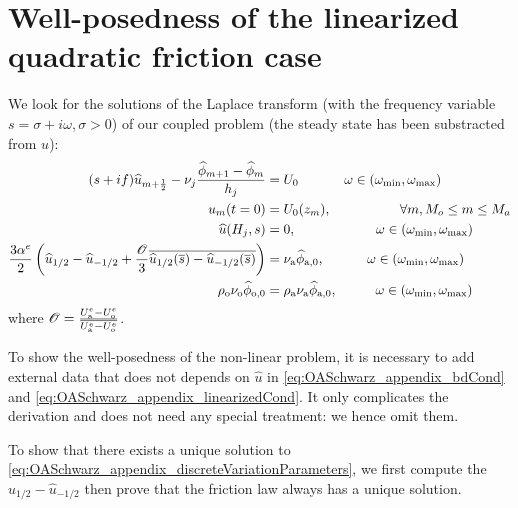 \section{Well-posedness of the linearized quadratic friction case}
\label{sec:OASchwarz_appendix_discreteVariationParameters}
We look for the solutions of the Laplace transform
(with the frequency variable $s=\sigma + i\omega, \sigma>0$) of our
coupled problem (the steady state has been substracted from $u$):
\begin{subequations}
	\label{eq:OASchwarz_appendix_discreteVariationParameters}
	\begin{align}
	(s + if) \widehat{u}_{m+\frac{1}{2}} -
		\nu_j \frac{\widehat{\phi}_{m+1} -
		\widehat{\phi}_m}{h_j}
		&=U_0
	\hspace{1.2cm} \omega \in
	(\omega_{\min},\omega_{\max})
		\label{eq:OASchwarz_appendix_eqFourier}\\
		u_m(t=0) &= U_0(z_m),   \hspace{1.8cm}
		\forall m, M_o \leq m \leq M_a \\
		\widehat{u}(H_j, s) &= 0,
		\hspace{2.1cm}
		\omega \in (\omega_{\min},\omega_{\max})
		\label{eq:OASchwarz_appendix_bdCond}\\
		\frac{3\alpha^e}{2} 
		\left( \widehat{u}_{1/2} - \widehat{u}_{-1/2}
		+ \frac{{\cal O}}{3} \overline{
			\widehat{u}_{1/2}(\overline{s}) -
		\widehat{u}_{-1/2}(\overline{s})} \right) &=
		\nu_{\rm a}\widehat{\phi}_{\rm a, 0},
		\hspace{1.12cm}
		\omega \in (\omega_{\min},\omega_{\max})
		\label{eq:OASchwarz_appendix_linearizedCond}
		\\
		\rho_{\rm o} \nu_{\rm o}\widehat{\phi}_{\rm o, 0}
		&= \rho_{\rm a} \nu_{\rm a}\widehat{\phi}_{\rm a, 0},
		\hspace{1.0cm}
		\omega \in (\omega_{\min},\omega_{\max})
		\label{eq:OASchwarz_appendix_continuityFlux}
		\end{align}
		\end{subequations}
where ${\cal O} = \frac{U_{\rm a}^e - U_{\rm o}^e}{\overline{U_{\rm a}^e
	- U_{\rm o}^e}}$.
\begin{remark}
	To show the well-posedness of the non-linear
	problem, it is necessary to add external data
	that does not depends on $\widehat{u}$
	in \eqref{eq:OASchwarz_appendix_bdCond} and
	\eqref{eq:OASchwarz_appendix_linearizedCond}.
	It only complicates the derivation and does not need
	any special treatment: we hence omit them.
\end{remark}
To show that there exists a unique solution to
\eqref{eq:OASchwarz_appendix_discreteVariationParameters},
we first compute the $\widehat{u}_{1/2} - \widehat{u}_{-1/2}$
then prove that the friction law always has a unique solution.
